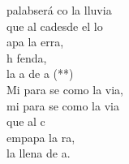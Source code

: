 \begin{cancion}[Mi Palabra][Nico]%
	 palabserá co la lluvia\\
	que al cadesde el lo\\
	apa la erra,\\
	h fenda,\\
	la a de a (**)\\
	\jump
	Mi para se como la via,\\
	mi para se como la via\\
	que al c   \\
	empapa la ra,\\
	la llena de a.\\
\end{cancion}%
